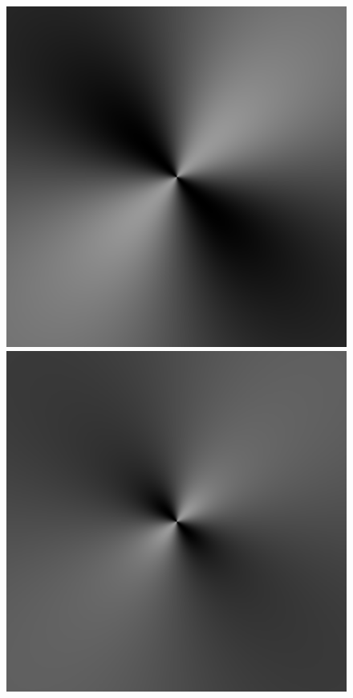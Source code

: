 \begin{figure}
{ }
 \subtop
 {
 \includegraphics[scale=0.25]{figures/unified_dfilt_wur_sqrt2.png}
 }
 \hfill
 \subtop
 {
 \includegraphics[scale=0.25]{figures/unified_dfilt_wur_sqrt8.png}
}
\end{figure}
